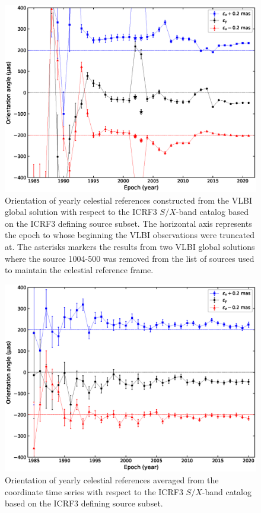 \documentclass{aa}
\begin{document}
    \begin{figure}
        \centering
        \includegraphics[width=\columnwidth]{figs/orient-from-yearly-solution}
        \caption{\label{fig:rot-yearly-sol}
        Orientation of yearly celestial references constructed from the VLBI global solution with respect to the ICRF3 $S/X$-band catalog based on the ICRF3 defining source subset. 
        The horizontal axis represents the epoch to whose beginning the VLBI observations were truncated at.
        The asterisks markers the results from two VLBI global solutions where the source 1004-500 was removed from the list of sources used to maintain the celestial reference frame.
            }
    \end{figure}
    
    \begin{figure}
        \centering
        \includegraphics[width=\columnwidth]{figs/orient-from-yearly-ts-glo}
        \caption{\label{fig:rot-yearly-ts}   
         Orientation of yearly celestial references averaged from the coordinate time series with respect to the ICRF3 $S/X$-band catalog based on the ICRF3 defining source subset. 
         }
    \end{figure}
    
\end{document}
